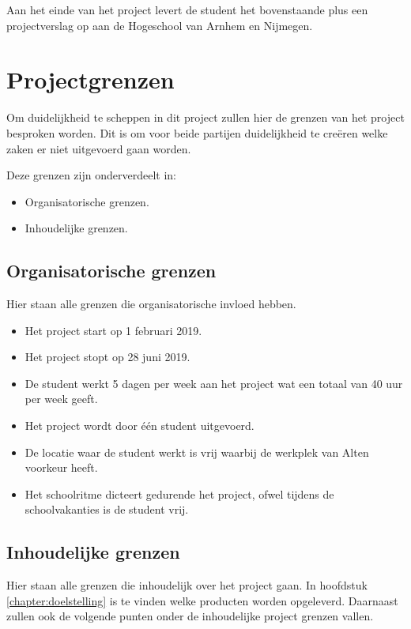 \documentclass[a4paper, 11pt, oneside]{report}
\begin{document}
Aan het einde van het project levert de student het bovenstaande plus een projectverslag op aan de Hogeschool van Arnhem en Nijmegen.

\chapter{Projectgrenzen}
\label{chapter:projectgrenzen}
Om duidelijkheid te scheppen in dit project zullen hier de grenzen van het project besproken worden.
Dit is om voor beide partijen duidelijkheid te creëren welke zaken er niet uitgevoerd gaan worden. 

Deze grenzen zijn onderverdeelt in:

\begin{itemize}
	\item Organisatorische grenzen.
	\item Inhoudelijke grenzen.
\end{itemize}

\section{Organisatorische grenzen}
Hier staan alle grenzen die organisatorische invloed hebben. 

\begin{itemize}
	\item Het project start op 1 februari 2019.
	\item Het project stopt op 28 juni 2019.
	\item De student werkt 5 dagen per week aan het project wat een totaal van 40 uur per week geeft.
	\item Het project wordt door één student uitgevoerd.
	\item De locatie waar de student werkt is vrij waarbij de werkplek van Alten voorkeur heeft.
	\item Het schoolritme dicteert gedurende het project, ofwel tijdens de schoolvakanties is de student vrij.
\end{itemize}

\section{Inhoudelijke grenzen}
Hier staan alle grenzen die inhoudelijk over het project gaan. In hoofdstuk \ref{chapter:doelstelling} is te vinden welke producten worden opgeleverd. Daarnaast zullen ook de volgende punten onder de inhoudelijke project grenzen vallen.
\end{document}
